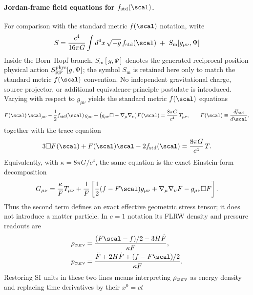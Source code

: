 \documentclass[12pt,a4paper]{article}
\begin{document}
\paragraph{Jordan-frame field equations for $f_{\rm std}(\scal)$.}
For comparison with the standard metric \(f(\scal)\) notation, write
\begin{equation}
S = \frac{c^4}{16\pi G}\int d^4x\,\sqrt{-g}\, f_{\rm std}(\scal)
\;+\; S_{\mathrm{m}}[g_{\mu\nu},\Psi]
\end{equation}
Inside the Born--Hopf branch, \(S_{\mathrm{m}}[g,\Psi]\) denotes the generated reciprocal-position physical action \(S_{\rm RP}^{\rm phys}[g,\Psi]\); the symbol \(S_{\mathrm{m}}\) is retained here only to match the standard metric \(f(\scal)\) convention.  No independent gravitational charge, source projector, or additional equivalence-principle postulate is introduced.
Varying with respect to $g_{\mu\nu}$ yields the standard metric $f(\scal)$ equations
\begin{equation}
F(\scal)\,\scal_{\mu\nu}-\frac{1}{2}f_{\rm std}(\scal)\,g_{\mu\nu}
+\bigl(g_{\mu\nu}\Box-\nabla_\mu\nabla_\nu\bigr)F(\scal)
= \frac{8\pi G}{c^4}\,T_{\mu\nu},
\qquad
F(\scal)\equiv \frac{d f_{\rm std}}{d\scal},
\label{p8:eq:fR_field_eq_std}
\end{equation}
together with the trace equation
\begin{equation}
3\Box F(\scal) + F(\scal)\scal - 2 f_{\rm std}(\scal)
= \frac{8\pi G}{c^4}\,T.
\label{p8:eq:fR_trace_std}
\end{equation}
Equivalently, with \(\kappa=8\pi G/c^4\), the same equation is the exact
Einstein-form decomposition
\begin{equation}
\label{p8:eq:exact-curvature-effective-tensor}
 G_{\mu\nu}=\frac{\kappa}{F}T_{\mu\nu}
 +\frac1F\left[
 \frac12(f-F\scal)g_{\mu\nu}
 +\nabla_\mu\nabla_\nu F-g_{\mu\nu}\Box F
 \right].
\end{equation}
Thus the second term defines an exact effective geometric stress tensor; it
does not introduce a matter particle.  In \(c=1\) notation its FLRW density
and pressure readouts are
\begin{align}
\label{p8:eq:exact-curvature-fluid-readout}
 \rho_{\rm curv}
 &=\frac{(F\scal-f)/2-3H\dot F}{\kappa F},\\
 p_{\rm curv}
 &=\frac{\ddot F+2H\dot F+(f-F\scal)/2}{\kappa F}.
\end{align}
Restoring SI units in these two lines means interpreting \(\rho_{\rm curv}\)
as energy density and replacing time derivatives by their \(x^0=ct\)
\end{document}
